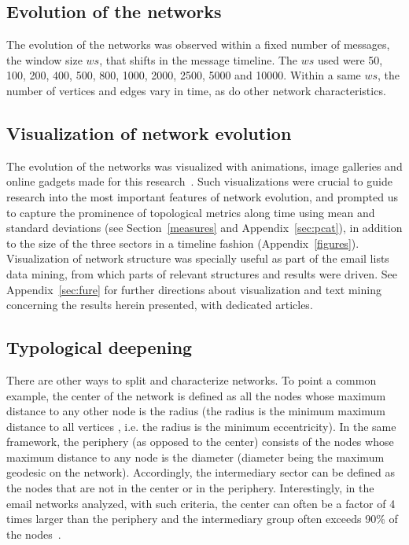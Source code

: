 \documentclass[%
 aip,
 jmp,%
 amsmath,amssymb,
 reprint,%
]{revtex4-1}
\begin{document}
   \subsection{Evolution of the networks}
The evolution of the networks was observed within a fixed number of messages, the window size $ws$, that shifts in the message timeline.
The $ws$ used were 50, 100, 200, 400, 500, 800, 1000, 2000, 2500, 5000 and 10000. Within a same $ws$, the number of vertices and edges vary in time, as do other network characteristics. 

        \subsection{Visualization of network evolution}
The evolution of the networks was visualized with animations, image galleries and online gadgets made for this research~\cite{animacoes,galGMANE,appGMANE}. Such visualizations were crucial to guide research into the most important features of network evolution, and prompted us to capture the prominence of topological metrics along time using mean and standard deviations (see Section~\ref{measures} and Appendix~\ref{sec:pcat}), in addition to the size of the three sectors in a timeline fashion (Appendix~\ref{figures}). Visualization of network structure was specially useful as part of the email lists data mining, from which parts of relevant structures and results were driven. See Appendix~\ref{sec:fure} for further directions about visualization and text mining concerning the results herein presented, with dedicated articles.


    \subsection{Typological deepening}\label{subsec:typ}
There are other ways to split and characterize networks. To point a common example, the center of the network is defined as all the nodes whose maximum distance to any other node is the radius (the radius is the minimum maximum distance to all vertices , i.e. the radius is the minimum eccentricity). 
In the same framework, the periphery (as opposed to the center) consists of the nodes whose maximum distance to any node is the diameter (diameter being the maximum geodesic on the network). Accordingly, the intermediary sector can be defined as the nodes that are not in the center or in the periphery. Interestingly, in the email networks analyzed, with such criteria, the center can often be a factor of 4 times larger than the periphery and the intermediary group often exceeds 90\% of the nodes~\cite{networkx}.
\end{document}
